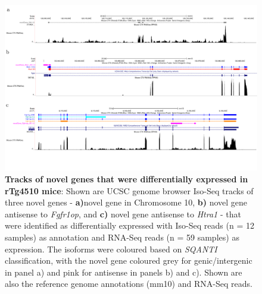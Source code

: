 \begin{landscape}
	\begin{figure}[!htp]
		\centering
		\includegraphics[page=1,trim={0 4cm 0 0}, scale = 0.45]{Figures/TracksFigures_Diff.pdf}
		\captionsetup{width=1.4\textwidth}
		\caption[Tracks of novel genes that were differentially expressed in rTg4510 mice]%
		{\textbf{Tracks of novel genes that were differentially expressed in rTg4510 mice}: Shown are UCSC genome browser Iso-Seq tracks of three novel genes - \textbf{a)}novel gene in Chromosome 10, \textbf{b)} novel gene antisense to \textit{Fgfr1op}, and \textbf{c)} novel gene antisense to \textit{Htra1} - that were identified as differentially expressed with Iso-Seq reads (n = 12 samples) as annotation and RNA-Seq reads (n = 59 samples) as expression. The isoforms were coloured based on \textit{SQANTI} classification, with the novel gene coloured grey for genic/intergenic in panel a) and pink for antisense in panels b) and c). Shown are also the reference genome annotations (mm10) and RNA-Seq reads.}   
		\label{fig:whole_novelgene_difftracks}
	\end{figure}
\end{landscape}

